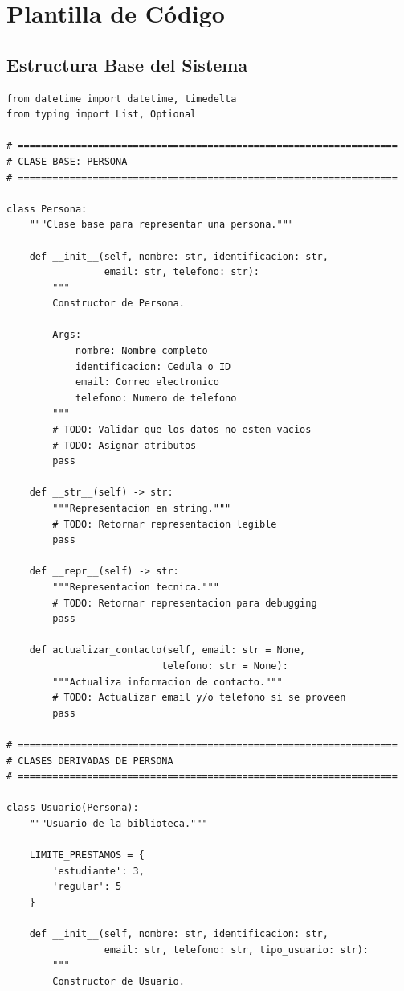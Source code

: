 \documentclass[11pt,letterpaper]{article}
\begin{document}
\section{Plantilla de Código}

\subsection{Estructura Base del Sistema}

\begin{lstlisting}[caption={Plantilla de clases principales}]
from datetime import datetime, timedelta
from typing import List, Optional

# ==================================================================
# CLASE BASE: PERSONA
# ==================================================================

class Persona:
    """Clase base para representar una persona."""
    
    def __init__(self, nombre: str, identificacion: str, 
                 email: str, telefono: str):
        """
        Constructor de Persona.
        
        Args:
            nombre: Nombre completo
            identificacion: Cedula o ID
            email: Correo electronico
            telefono: Numero de telefono
        """
        # TODO: Validar que los datos no esten vacios
        # TODO: Asignar atributos
        pass
    
    def __str__(self) -> str:
        """Representacion en string."""
        # TODO: Retornar representacion legible
        pass
    
    def __repr__(self) -> str:
        """Representacion tecnica."""
        # TODO: Retornar representacion para debugging
        pass
    
    def actualizar_contacto(self, email: str = None, 
                           telefono: str = None):
        """Actualiza informacion de contacto."""
        # TODO: Actualizar email y/o telefono si se proveen
        pass

# ==================================================================
# CLASES DERIVADAS DE PERSONA
# ==================================================================

class Usuario(Persona):
    """Usuario de la biblioteca."""
    
    LIMITE_PRESTAMOS = {
        'estudiante': 3,
        'regular': 5
    }
    
    def __init__(self, nombre: str, identificacion: str, 
                 email: str, telefono: str, tipo_usuario: str):
        """
        Constructor de Usuario.
        

\end{lstlisting}
\end{document}
